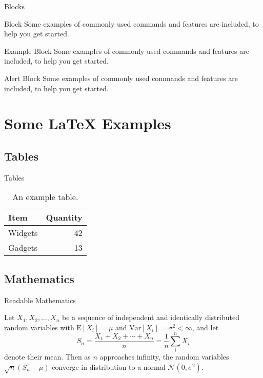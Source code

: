 \documentclass[10pt,compress]{beamer} %
\begin{document}
\begin{frame}{Blocks}

\begin{block}{Block}
Some examples of commonly used commands and features are included, to help you get started.
\end{block}

\begin{exampleblock}{Example Block}
Some examples of commonly used commands and features are included, to help you get started.
\end{exampleblock}

\begin{alertblock}{Alert Block}
Some examples of commonly used commands and features are included, to help you get started.
\end{alertblock}

\end{frame}

\section{Some \LaTeX{} Examples}
\subsection{Tables}

\begin{frame}{Tables}

\begin{table}
\centering
\begin{tabular}{l|r}
Item & Quantity \\\hline
Widgets & 42 \\
Gadgets & 13
\end{tabular}
\caption{\label{tab:widgets}An example table.}
\end{table}

\end{frame}

\subsection{Mathematics}

\begin{frame}{Readable Mathematics}

Let $X_1, X_2, \ldots, X_n$ be a sequence of independent and identically distributed random variables with $\text{E}[X_i] = \mu$ and $\text{Var}[X_i] = \sigma^2 < \infty$, and let
$$S_n = \frac{X_1 + X_2 + \cdots + X_n}{n}
      = \frac{1}{n}\sum_{i}^{n} X_i$$
denote their mean. Then as $n$ approaches infinity, the random variables $\sqrt{n}(S_n - \mu)$ converge in distribution to a normal $\mathcal{N}(0, \sigma^2)$.

\end{frame}
\end{document}
